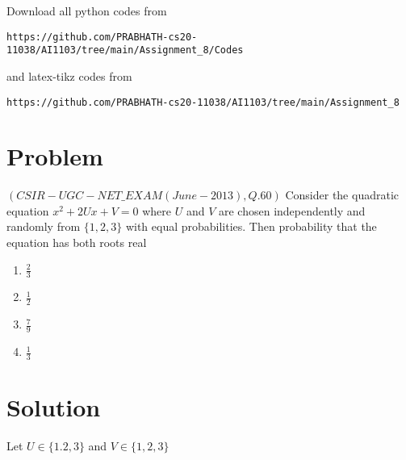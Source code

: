 \documentclass[journal,12pt,twocolumn]{IEEEtran}
\begin{document}
Download all python codes from 
\begin{lstlisting}
https://github.com/PRABHATH-cs20-11038/AI1103/tree/main/Assignment_8/Codes
\end{lstlisting}

and latex-tikz codes from
\begin{lstlisting}
https://github.com/PRABHATH-cs20-11038/AI1103/tree/main/Assignment_8
\end{lstlisting}

\section{Problem}

$(CSIR-UGC-NET\_EXAM(June-2013), Q.60)$ Consider the quadratic equation $x^2+2U x+V=0$ where $U$ and $V$ are chosen independently and randomly from $\{1,2,3\}$ with equal probabilities. Then probability that the equation has both roots real
\begin{multicols}{4}
\begin{enumerate}
    \item $\frac{2}{3}$
    \item $\frac{1}{2}$
    \item $\frac{7}{9}$
    \item $\frac{1}{3}$
\end{enumerate}
\end{multicols}

\section{Solution}

Let $U\in\{1.2,3\}$ and $V\in\{1,2,3\}$
\begin{table}[h!]
\centering
\caption{Probability of selecting values for $U$}
\label{Table1}
\end{table}
\begin{table}[h!]
\centering
\caption{Probability of selecting values for $V$}
\label{Table2}
\end{table}
\end{document}
